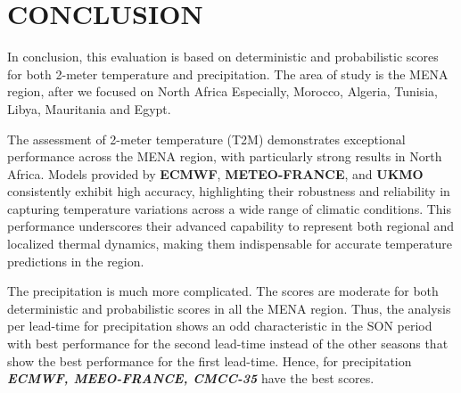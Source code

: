 \chapter*{CONCLUSION}
In conclusion, this evaluation is based on deterministic and probabilistic scores for both 2-meter temperature and precipitation. The area of study is the MENA region, after we focused on North Africa Especially, Morocco, Algeria, Tunisia, Libya, Mauritania and Egypt.

 The assessment of 2-meter temperature (T2M) demonstrates exceptional performance across the MENA region, with particularly strong results in North Africa. Models provided by \textbf{ECMWF}, \textbf{METEO-FRANCE}, and \textbf{UKMO} consistently exhibit high accuracy, highlighting their robustness and reliability in capturing temperature variations across a wide range of climatic conditions. This performance underscores their advanced capability to represent both regional and localized thermal dynamics, making them indispensable for accurate temperature predictions in the region.
 
 The precipitation is much more complicated. The scores are moderate for both deterministic and probabilistic scores in all the MENA region. Thus, the analysis per lead-time for precipitation shows an odd characteristic in the SON period with best performance for the second lead-time instead of the other seasons that show the best performance for the first lead-time. Hence, for precipitation \textbf{\textit{ECMWF, MEEO-FRANCE, CMCC-35}} have the best scores. 